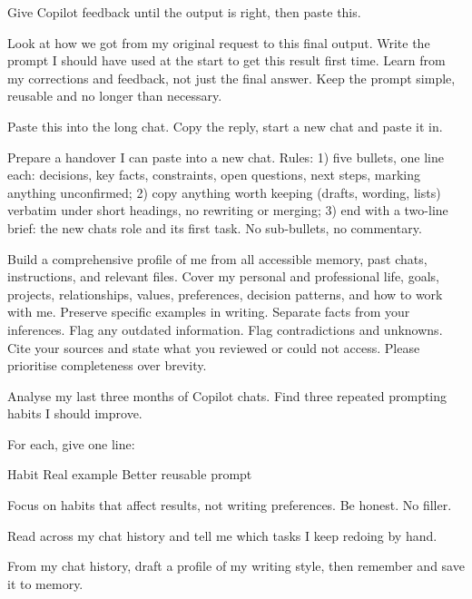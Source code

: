 \documentclass[9pt]{extarticle}
\newcommand{\gap}{\par\vspace{0.5ex}}
\newcommand{\exskip}{4.5mm}
\newcommand{\ex}[2]{\par\vspace{\exskip}\needspace{4\baselineskip}%
  {\setlength{\fboxsep}{2pt}\colorbox{accent}{\makebox[\widthof{\bfseries\small M365}][c]{\color{white}\bfseries\small\strut #1}}\hspace{1.5mm}{\bfseries\large #2}}\hspace{2.5mm}}
\newcommand{\note}[1]{{\small\color{muted}#1}\par}
\newcommand{\sub}[1]{\par\vspace{1.5mm}{\small\bfseries #1}\par}
\begin{document}
\ex{B2}{Turn a good chat into a reusable prompt}
\note{Give Copilot feedback until the output is right, then paste this.}
\begin{pbox}
Look at how we got from my original request to this final output. Write the prompt I should have used at the start to get this result first time. Learn from my corrections and feedback, not just the final answer. Keep the prompt simple, reusable and no longer than necessary.\par
\end{pbox}

\ex{B3}{Handover: long chats make more mistakes}
\note{Paste this into the long chat. Copy the reply, start a new chat and paste it in.}
\begin{pbox}
Prepare a handover I can paste into a new chat. Rules: 1) five bullets, one line each: decisions, key facts, constraints, open questions, next steps, marking anything unconfirmed; 2) copy anything worth keeping (drafts, wording, lists) verbatim under short headings, no rewriting or merging; 3) end with a two-{}line brief: the new chat\textquotesingle{}s role and its first task. No sub-{}bullets, no commentary.\par
\end{pbox}

\ex{B4}{Treat your chat history as a resource}
\sub{Build a full profile of yourself}
\begin{pbox}
Build a comprehensive profile of me from all accessible memory, past chats, instructions, and relevant files. Cover my personal and professional life, goals, projects, relationships, values, preferences, decision patterns, and how to work with me. Preserve specific examples in writing. Separate facts from your inferences. Flag any outdated information. Flag contradictions and unknowns. Cite your sources and state what you reviewed or could not access. Please prioritise completeness over brevity.\par
\end{pbox}
\sub{Find prompting habits you repeat}
\begin{pbox}
Analyse my last three months of Copilot chats. Find three repeated prompting habits I should improve.\par
\gap
For each, give one line:\par
Habit \textbar{} Real example \textbar{} Better reusable prompt\par
\gap
Focus on habits that affect results, not writing preferences. Be honest. No filler.\par
\end{pbox}
\sub{Spot tasks you keep redoing by hand}
\begin{pbox}
Read across my chat history and tell me which tasks I keep redoing by hand.\par
\end{pbox}
\sub{Capture your writing style}
\begin{pbox}
From my chat history, draft a profile of my writing style, then remember and save it to memory.\par
\end{pbox}
\end{document}
